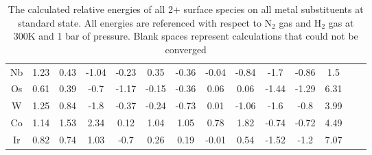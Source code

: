 \begin{table}
\begin{center}
\begin{tabular}{| c | c | c | c | c | c | c | c | c | c | c | c | c | c |}
Nb & 1.23 & 0.43 & -1.04 & -0.23 & 0.35 & -0.36 & -0.04 & -0.84 & -1.7 & -0.86 & 1.5 \\
Os & 0.61 & 0.39 & -0.7 & -1.17 & -0.15 & -0.36 & 0.06 & 0.06 & -1.44 & -1.29 & 6.31 \\
W & 1.25 & 0.84 & -1.8 & -0.37 & -0.24 & -0.73 & 0.01 & -1.06 & -1.6 & -0.8 & 3.99 \\
Co & 1.14 & 1.53 & 2.34 & 0.12 & 1.04 & 1.05 & 0.78 & 1.82 & -0.74 & -0.72 & 4.49 \\
Ir & 0.82 & 0.74 & 1.03 & -0.7 & 0.26 & 0.19 & -0.01 & 0.54 & -1.52 & -1.2 & 7.07 \\
\hline
\end{tabular}
\end{center}
\caption{The calculated relative energies of all 2+ surface species on all metal substituents at standard state. All energies are referenced with respect to N$_2$ gas and H$_2$ gas at 300K and 1 bar of pressure. Blank spaces represent calculations that could not be converged}
\label{table:energies}
\end{table}

